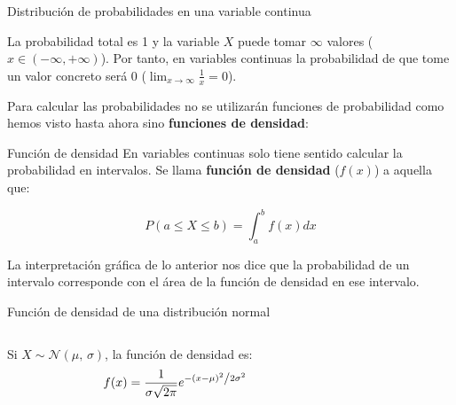 \documentclass[11pt,handout]{beamer}
\begin{document}
\begin{frame}{Distribución de probabilidades en una variable continua}

La probabilidad total es 1 y la variable $X$ puede tomar $\infty$ valores ($x \in \left(-\infty, +\infty\right)$). Por tanto, en variables continuas la probabilidad de que tome un valor concreto será 0 ($\lim_{x \to \infty}\frac{1}{x}=0$).    

Para calcular las probabilidades no se utilizarán funciones de probabilidad como hemos visto hasta ahora sino \textbf{funciones de densidad}:
\end{frame}

\begin{frame}{Función de densidad}
En variables continuas solo tiene sentido calcular la probabilidad en intervalos.
Se llama \textbf{función de densidad} ($f(x)$) a aquella que: 
\begin{block}{}
$$P\left(a\leq X \leq b \right) = \int_{a}^{b} f(x) dx$$
\end{block}    


La interpretación gráfica de lo anterior nos dice que la probabilidad de un intervalo corresponde con el área de la función de densidad en ese intervalo.
\begin{center}


\end{center}
\end{frame}


\begin{frame}{Función de densidad de una distribución normal}  
\begin{columns}
\begin{column}{0.4\textwidth}
\begin{block}{}
Si $
X \sim \mathcal{N}(\mu,\,\sigma)
    $, la función de densidad es:
    $$f(x)=\frac{1}{{\sigma \sqrt {2\pi } }}e^{{{ - \left( {x - \mu } \right)^2 } \mathord{\left/ {\vphantom {{ - \left( {x - \mu } \right)^2 } {2\sigma ^2 }}} \right. \kern-\nulldelimiterspace} {2\sigma ^2 }}}$$
\end{block}
\end{column}
\begin{column}{0.6\textwidth}

\end{column}
\end{columns}{}

\end{frame}
\end{document}

